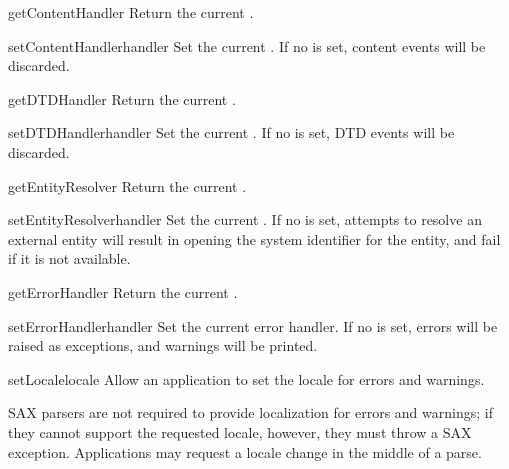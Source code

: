 \begin{methoddesc}[XMLReader]{getContentHandler}{}
  Return the current .
\end{methoddesc}

\begin{methoddesc}[XMLReader]{setContentHandler}{handler}
  Set the current .  If no
   is set, content events will be discarded.
\end{methoddesc}

\begin{methoddesc}[XMLReader]{getDTDHandler}{}
  Return the current .
\end{methoddesc}

\begin{methoddesc}[XMLReader]{setDTDHandler}{handler}
  Set the current .  If no  is
  set, DTD events will be discarded.
\end{methoddesc}

\begin{methoddesc}[XMLReader]{getEntityResolver}{}
  Return the current .
\end{methoddesc}

\begin{methoddesc}[XMLReader]{setEntityResolver}{handler}
  Set the current .  If no
   is set, attempts to resolve an external
  entity will result in opening the system identifier for the entity,
  and fail if it is not available. 
\end{methoddesc}

\begin{methoddesc}[XMLReader]{getErrorHandler}{}
  Return the current .
\end{methoddesc}

\begin{methoddesc}[XMLReader]{setErrorHandler}{handler}
  Set the current error handler.  If no  is set,
  errors will be raised as exceptions, and warnings will be printed.
\end{methoddesc}

\begin{methoddesc}[XMLReader]{setLocale}{locale}
  Allow an application to set the locale for errors and warnings. 
   
  SAX parsers are not required to provide localization for errors and
  warnings; if they cannot support the requested locale, however, they
  must throw a SAX exception.  Applications may request a locale change
  in the middle of a parse.
\end{methoddesc}

